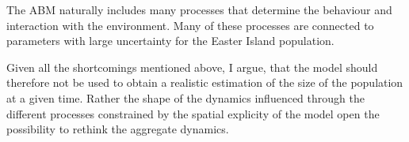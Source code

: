 The ABM naturally includes many processes that determine the behaviour and interaction with the environment. 
Many of these processes are connected to parameters with large uncertainty for the Easter Island population.

Given all the shortcomings mentioned above, I argue, that the model should therefore not be used to obtain a realistic estimation of the size of the population at a given time. 
Rather the shape of the dynamics influenced through the different processes constrained by the spatial explicity of the model open the possibility to rethink the aggregate dynamics.







